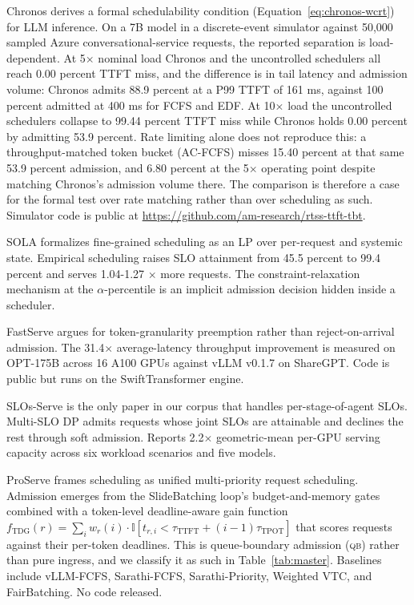 Chronos \citep{marref2026chronos} derives a formal schedulability
condition (Equation~\ref{eq:chronos-wcrt}) for LLM inference. On a 7B
model in a discrete-event simulator against 50{,}000 sampled Azure
conversational-service requests, the reported separation is
load-dependent. At 5$\times$ nominal load Chronos and the uncontrolled
schedulers all reach 0.00 percent TTFT miss, and the difference is in
tail latency and admission volume: Chronos admits 88.9 percent at a P99
TTFT of 161 ms, against 100 percent admitted at 400 ms for FCFS and
EDF. At 10$\times$ load the uncontrolled schedulers collapse to 99.44
percent TTFT miss while Chronos holds 0.00 percent by admitting 53.9
percent. Rate limiting alone does not reproduce this: a
throughput-matched token bucket (AC-FCFS) misses 15.40 percent at that
same 53.9 percent admission, and 6.80 percent at the 5$\times$
operating point despite matching Chronos's admission volume there. The
comparison is therefore a case for the formal test over rate matching
rather than over scheduling as such. Simulator code
is public at \url{https://github.com/am-research/rtss-ttft-tbt}.

SOLA \citep{hong2025sola} formalizes fine-grained scheduling as an LP
over per-request and systemic state. Empirical scheduling raises SLO
attainment from 45.5 percent to 99.4 percent and serves 1.04-1.27
$\times$ more requests. The constraint-relaxation mechanism at the
$\alpha$-percentile is an implicit admission decision hidden inside a
scheduler.

FastServe \citep{wu2026fastserve} argues for token-granularity
preemption rather than reject-on-arrival admission. The 31.4$\times$
average-latency throughput improvement is measured on OPT-175B across
16 A100 GPUs against vLLM v0.1.7 on ShareGPT. Code is public but runs
on the SwiftTransformer engine.

SLOs-Serve \citep{chen2025slosserve} is the only paper in our corpus
that handles per-stage-of-agent SLOs. Multi-SLO DP admits requests
whose joint SLOs are attainable and declines the rest through soft
admission. Reports 2.2$\times$ geometric-mean per-GPU serving capacity
across six workload scenarios and five models.

ProServe \citep{huang2025proserve} frames scheduling as unified
multi-priority request scheduling. Admission emerges from the
SlideBatching loop's budget-and-memory gates combined with a
token-level deadline-aware gain function
$f_{\text{TDG}}(r) = \sum_i w_r(i) \cdot
\mathbb{I}[t_{r,i} < \tau_{\text{TTFT}} + (i-1)\tau_{\text{TPOT}}]$
that scores requests against their per-token deadlines. This is
queue-boundary admission (\textsc{qb}) rather than pure ingress, and
we classify it as such in Table~\ref{tab:master}. Baselines include
vLLM-FCFS, Sarathi-FCFS, Sarathi-Priority, Weighted VTC, and
FairBatching. No code released.

